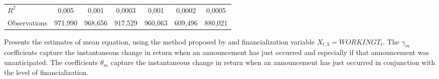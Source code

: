 \begin{landscape}
\begin{table}[]
{\begin{tabular}{lllllllllllll}
$R^2$ &
  \multicolumn{2}{c}{0,005} &
  \multicolumn{2}{c}{0,001} &
  \multicolumn{2}{c}{0,0003} &
  \multicolumn{2}{c}{0,001} &
  \multicolumn{2}{c}{0,0002} &
  \multicolumn{2}{c}{0,0005} \\
Observations &
  \multicolumn{2}{c}{971,990} &
  \multicolumn{2}{c}{968,656} &
  \multicolumn{2}{c}{917,529} &
  \multicolumn{2}{c}{960,063} &
  \multicolumn{2}{c}{609,496} &
  \multicolumn{2}{c}{880,021} \\ \hline
\end{tabular}%
}
\singlespacing
        \footnotesize
 Presents the estimates of mean equation, using the method proposed by \citep{andersen2007real} and financialization variable $X_{t,3}=WORKINGT_t$. The $\gamma_m$ coefficients capture the instantaneous change in return when an announcement has just occurred and especially if that announcement was unanticipated. The coefficients $\theta_m$ capture the instantaneous change in return when an announcement has just occurred in conjunction with the level of financialization.
\end{table}
\end{landscape}

